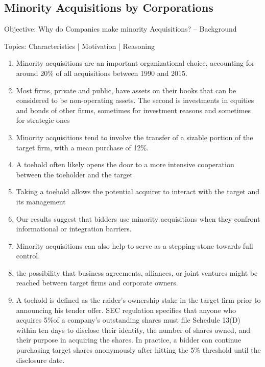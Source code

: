 \documentclass[12pt]{article}
\begin{document}
\subsection{Minority Acquisitions by Corporations} 
\begin{center}
Objective: Why do Companies make minority Acquisitions? -- Background
\end{center} 
Topics: Characteristics | Motivation | Reasoning 
    \begin{enumerate}

		\item Minority acquisitions are an important organizational choice, accounting for around 20\% of all acquisitions between 1990 and 2015.\citep{Huang2017}

		\item Most firms, private and public, have assets on their books that can be considered to be non-operating assets. The second is investments in equities and bonds of other firms, sometimes for investment reasons and sometimes for strategic ones \citep{Damodaran2005}
		
        \item Minority acquisitions tend to involve the transfer of a sizable portion of the target firm, with a mean purchase of 12\%. \citep{Ouimet2013}
		
		\item A toehold often likely opens the door to a more intensive cooperation between the toeholder and the target \citep{Povel2014}
		\item Taking a toehold allows the potential acquirer to interact with the target and its management \citep{Povel2014}
	   	\item Our results suggest that bidders use minority acquisitions when they confront informational or integration barriers. \citep{Huang2017}
	   
		\item Minority acquisitions can also help to serve as a stepping-stone towards full control. \citep{Huang2017}
		\item the possibility that business agreements, alliances, or joint ventures might be reached between target firms and corporate owners. \citep{Allen2000}
		
        \item A toehold is defined as the raider’s ownership stake in the target firm prior to announcing his tender offer. SEC regulation specifies that anyone who acquires 5\%of a company’s outstanding shares must file Schedule 13(D) within ten days to disclose their identity, the number of shares owned, and their purpose in acquiring the shares. In practice, a bidder can continue purchasing target shares anonymously after hitting the 5\% threshold until the disclosure date. \citep{Goldman2005}

    \end{enumerate}
\end{document}
